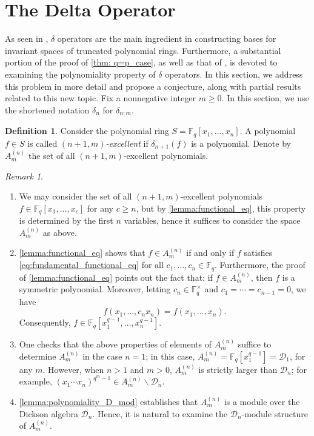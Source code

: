 \documentclass[12pt,a4paper]{report}
\theoremstyle{definition}
\newtheorem{definition}[theorem]{Definition}
\theoremstyle{remark}
\newtheorem*{remark}{Remark}
\theoremstyle{definition}
\begin{document}
\section{The Delta Operator}\label{sec:delta_operator}
As seen in , $\delta$ operators are the main ingredient in constructing bases for invariant spaces of truncated polynomial rings. Furthermore, a substantial portion of the proof of \cref{thm: q=p_case}, as well as that of \cite[Theorem 1.6]{Ha_Hai_Nghia_2024}, is devoted to examining the polynomiality property of $\delta$ operators. In this section, we address this problem in more detail and propose a conjecture, along with partial results related to this new topic.\smallbreak
Fix a nonnegative integer $m\geq 0$. In this section, we use the shortened notation $\delta_n$ for $\delta_{n;m}$.
\begin{definition}\label{def:}
    Consider the polynomial ring $S = \mathbb{F}_q[x_1, \ldots, x_n]$. A polynomial $f\in S$ is called \emph{$(n+1, m)$-excellent} if $\delta_{n+1}(f)$ is a polynomial. Denote by $A_{m}^{(n)}$ the set of all $(n+1, m)$-excellent polynomials. 
\end{definition}
\begin{remark}
    \begin{enumerate}
    \item We may consider the set of all $(n+1, m)$-excellent polynomials $f\in \mathbb{F}_q[x_1, \ldots, x_c]$ for any $c\geq n$, but by \cref{lemma:functional_eq}, this property is determined by the first $n$ variables, hence it suffices to consider the space $A_{m}^{(n)}$ as above.
        \item \cref{lemma:functional_eq} shows that $f\in A_{m}^{(n)}$ if and only if $f$ satisfies \eqref{eq:fundamental_functional_eq} for all $c_1, \ldots, c_{n}\in \mathbb{F}_q$. Furthermore, the proof of \cref{lemma:functional_eq} points out the fact that: if $f\in A_{m}^{(n)}$, then $f$ is a symmetric polynomial. Moreover, letting $c_{n} \in \mathbb{F}_q^{\times}$ and $c_1= \cdots = c_{n-1}=0$, we have
        \begin{equation*}
            f(x_1, \ldots, c_n x_n) = f(x_1, \ldots, x_n).
        \end{equation*}
        Consequently, $f\in \mathbb{F}_q[x_1^{q-1}, \ldots, x_n^{q-1}]$.
        \item One checks that the above properties of elements of $A_{m}^{(n)}$ suffice to determine $A_{m}^{(n)}$ in the case $n=1$; in this case, $A_{m}^{(n)} = \mathbb{F}_q[x_1^{q-1}] = \mathcal{D}_1$, for any $m$. However, when $n>1$ and $m>0$, $A_{m}^{(n)}$ is strictly larger than $\mathcal{D}_n$; for example, $(x_1\cdots x_n)^{q^m-1}\in A_{m}^{(n)}\backslash \mathcal{D}_n$.
        \item \cref{lemma:polynomiality_D_mod} establishes that $A_{m}^{(n)}$ is a module over the Dickson algebra $\mathcal{D}_n$. Hence, it is natural to examine the $\mathcal{D}_n$-module structure of $A_{m}^{(n)}$.
    \end{enumerate}
\end{remark}
\end{document}
